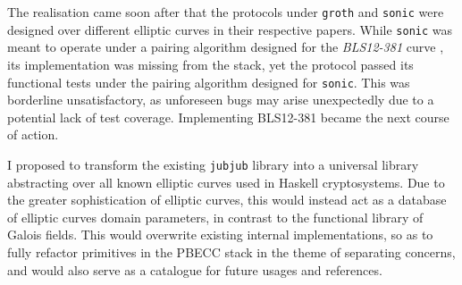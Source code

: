 \documentclass[11pt]{article}
\begin{document}
The realisation came soon after that the protocols under \texttt{groth} and \texttt{sonic} were designed over different elliptic curves in their respective papers. While \texttt{sonic} was meant to operate under a pairing algorithm designed for the \emph{BLS12-381} curve \cite{bls}, its implementation was missing from the stack, yet the protocol passed its functional tests under the pairing algorithm designed for \texttt{sonic}. This was borderline unsatisfactory, as unforeseen bugs may arise unexpectedly due to a potential lack of test coverage. Implementing BLS12-381 became the next course of action.

I proposed to transform the existing \texttt{jubjub} library into a universal library abstracting over all known elliptic curves used in Haskell cryptosystems. Due to the greater sophistication of elliptic curves, this would instead act as a database of elliptic curves domain parameters, in contrast to the functional library of Galois fields. This would overwrite existing internal implementations, so as to fully refactor primitives in the PBECC stack in the theme of separating concerns, and would also serve as a catalogue for future usages and references.
\end{document}
